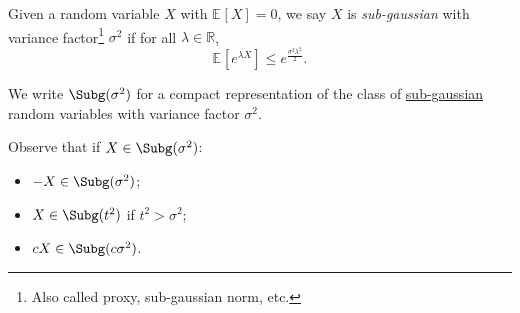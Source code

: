 \begin{definition}\label{def:sub-gaussian}
  Given a random variable \(X\) with \(\mathbb{E}_{}\left[X \right] = 0\), we say \(X\) is \emph{sub-gaussian} with variance factor\footnote{Also called proxy, sub-gaussian norm, etc.} \(\sigma ^2\) if for all \(\lambda \in \mathbb{R} \),
  \[
    \mathbb{E}_{}\left[e^{\lambda X} \right] \leq e^{\frac{\sigma ^2 \lambda ^2}{2}}.
  \]
\end{definition}

\begin{notation}
  We write \(\Subg(\sigma ^{2} ) \) for a compact representation of the class of \hyperref[def:sub-gaussian]{sub-gaussian} random variables with variance factor \(\sigma ^{2} \).
\end{notation}

\begin{remark}
  Observe that if \(X\in \Subg(\sigma ^{2} ) \):
  \begin{itemize}
    \item \(-X\in \Subg(\sigma ^{2} ) \);
    \item \(X \in \Subg(t^2) \) if \(t^2 > \sigma ^{2} \);
    \item \(cX\in \Subg(c \sigma ^{2} ) \).
  \end{itemize}
\end{remark}

